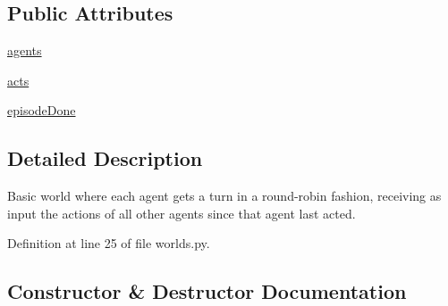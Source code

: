 \subsection*{Public Attributes}
\begin{DoxyCompactItemize}
\item 
\hyperlink{classparlai_1_1mturk_1_1tasks_1_1multi__agent__dialog_1_1worlds_1_1MTurkMultiAgentDialogWorld_a97fe2748f07a131082c1be761d4d749a}{agents}
\item 
\hyperlink{classparlai_1_1mturk_1_1tasks_1_1multi__agent__dialog_1_1worlds_1_1MTurkMultiAgentDialogWorld_af92ab4ec8dc965e1b74dfc5904108983}{acts}
\item 
\hyperlink{classparlai_1_1mturk_1_1tasks_1_1multi__agent__dialog_1_1worlds_1_1MTurkMultiAgentDialogWorld_aac2d2dcd27769554281ca4a8d29929ae}{episode\+Done}
\end{DoxyCompactItemize}


\subsection{Detailed Description}
\begin{DoxyVerb}Basic world where each agent gets a turn in a round-robin fashion, receiving as
input the actions of all other agents since that agent last acted.
\end{DoxyVerb}
 

Definition at line 25 of file worlds.\+py.



\subsection{Constructor \& Destructor Documentation}
\mbox{\label{classparlai_1_1mturk_1_1tasks_1_1multi__agent__dialog_1_1worlds_1_1MTurkMultiAgentDialogWorld_a185e26d6db072184496992b3bd580c57}} 
